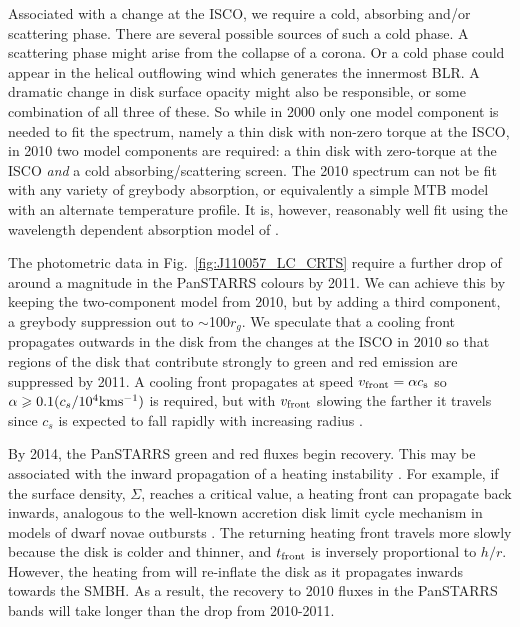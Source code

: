 \documentclass[a4paper,fleqn,usenatbib]{mnras}
\begin{document}
Associated with a change at the ISCO, we require a cold, absorbing
and/or scattering phase. There are several possible sources of such a
cold phase. A scattering phase might arise from the collapse of a
corona. Or a cold phase could appear in the helical outflowing wind
which generates the innermost BLR. A dramatic change in disk surface
opacity might also be responsible, or some combination of all three of
these. So while in 2000 only one model component is needed to fit the
spectrum, namely a thin disk with non-zero torque at the ISCO, in 2010
two model components are required: a thin disk with zero-torque at the
ISCO \emph{and} a cold absorbing/scattering screen. The 2010 spectrum
can not be fit with any variety of greybody absorption, or
equivalently a simple MTB model with an alternate temperature
profile. It is, however, reasonably well fit using the wavelength
dependent absorption model of \citet{Guo2016}.

The photometric data in Fig.~\ref{fig:J110057_LC_CRTS} require a
further drop of around a magnitude in the PanSTARRS colours by
2011. We can achieve this by keeping the two-component model from
2010, but by adding a third component, a greybody suppression out to
$\sim$100$r_{g}$. We speculate that a cooling front propagates outwards
in the disk from the changes at the ISCO in 2010 so that regions of
the disk that contribute strongly to green and red emission are
suppressed by 2011. A cooling front propagates at speed $v_{\rm
front}=\alpha c_{\rm s}$ \citep{Hameury2009} so $\alpha \geq
0.1(c_{s}/10^{4}{\rm km s^{-1}})$ is required, but with $v_{\rm front}$
slowing the farther it travels since $c_{s}$ is expected to fall
rapidly with increasing radius \citep{Sirko_Goodman2003}.

By 2014, the PanSTARRS green and red fluxes begin recovery. This may
be associated with the inward propagation of a heating instability
\citep{Hameury2009}. For example, if the surface density, $\Sigma$,
reaches a critical value, a heating front can propagate back inwards,
analogous to the well-known accretion disk limit cycle mechanism in
models of dwarf novae outbursts \citep[e.g.,][]{Cannizzo1998}. The
returning heating front travels more slowly because the disk is colder
and thinner, and $t_{\rm front}$ is inversely proportional to
$h/r$. However, the heating from will re-inflate the disk as it
propagates inwards towards the SMBH. As a result, the recovery to 2010
fluxes in the PanSTARRS bands will take longer than the drop from
2010-2011.
\end{document}
